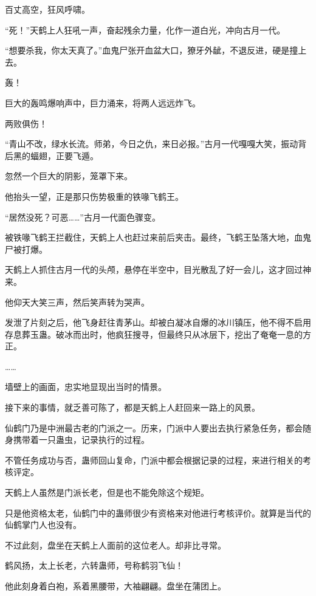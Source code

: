 
\begin{this_body}

百丈高空，狂风呼啸。

“死！”天鹤上人狂吼一声，奋起残余力量，化作一道白光，冲向古月一代。

“想要杀我，你太天真了。”血鬼尸张开血盆大口，獠牙外龇，不退反进，硬是撞上去。

轰！

巨大的轰鸣爆响声中，巨力涌来，将两人远远炸飞。

两败俱伤！

“青山不改，绿水长流。师弟，今日之仇，来日必报。”古月一代嘎嘎大笑，振动背后黑的蝠翅，正要飞遁。

忽然一个巨大的阴影，笼罩下来。

他抬头一望，正是那只伤势极重的铁喙飞鹤王。

“居然没死？可恶……”古月一代面色骤变。

被铁喙飞鹤王拦截住，天鹤上人也赶过来前后夹击。最终，飞鹤王坠落大地，血鬼尸被打爆。

天鹤上人抓住古月一代的头颅，悬停在半空中，目光散乱了好一会儿，这才回过神来。

他仰天大笑三声，然后笑声转为哭声。

发泄了片刻之后，他飞身赶往青茅山。却被白凝冰自爆的冰川镇压，他不得不启用存息葬玉蛊。破冰而出时，他疯狂搜寻，但最终只从冰层下，挖出了奄奄一息的方正。

……

墙壁上的画面，忠实地显现出当时的情景。

接下来的事情，就乏善可陈了，都是天鹤上人赶回来一路上的风景。

仙鹤门乃是中洲最古老的门派之一。历来，门派中人要出去执行紧急任务，都会随身携带着一只蛊虫，记录执行的过程。

不管任务成功与否，蛊师回山复命，门派中都会根据记录的过程，来进行相关的考核评定。

天鹤上人虽然是门派长老，但是也不能免除这个规矩。

只是他资格太老，仙鹤门中的蛊师很少有资格来对他进行考核评价。就算是当代的仙鹤掌门人也没有。

不过此刻，盘坐在天鹤上人面前的这位老人。却非比寻常。

鹤风扬，太上长老，六转蛊师，号称鹤羽飞仙！

他此刻身着白袍，系着黑腰带，大袖翩翩。盘坐在蒲团上。


\end{this_body}
